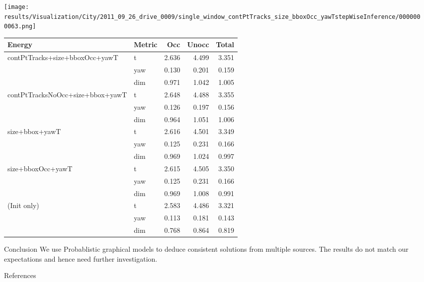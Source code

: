 \documentclass[final]{beamer}
\newlength{\sepwid}
\newlength{\onecolwid}
\begin{document}
\begin{frame}[t]
\begin{columns}[t]
    \begin{column}{\onecolwid}
      \begin{block}{}
        \texttt{[image: results/Visualization/City/2011\_09\_26\_drive\_0009/single\_window\_contPtTracks\_size\_bboxOcc\_yawTstepWiseInference/0000000063.png]}
      \end{block}
      \begin{table}
        \begin{tabular}{|l|l|r|r|r|}
          \hline
          Energy & Metric & Occ & Unocc & Total\\
          \hline
contPtTracks+size+bboxOcc+yawT  &t  &2.636&4.499&3.351\\
                                &yaw&0.130&0.201&0.159\\
                                &dim&0.971&1.042&1.005\\
          \hline
contPtTracksNoOcc+size+bbox+yawT&t  &2.648&4.488&3.355\\
                                &yaw&0.126&0.197&0.156\\
                                &dim&0.964&1.051&1.006\\
          \hline
                  size+bbox+yawT&t  &2.616&4.501&3.349\\
                                &yaw&0.125&0.231&0.166\\
                                &dim&0.969&1.024&0.997\\
          \hline
               size+bboxOcc+yawT&t  &2.615&4.505&3.350\\
                                &yaw&0.125&0.231&0.166\\
                                &dim&0.969&1.008&0.991\\
          \hline
          (Init only)           &t  &2.583&4.486&3.321\\
                                &yaw&0.113&0.181&0.143\\
                                &dim&0.768&0.864&0.819\\
          \hline
          
        \end{tabular}
      \end{table}
      \begin{block}{Conclusion}
        We use Probablistic graphical models to deduce consistent solutions from multiple sources. The results do not match our expectations and hence need further investigation.
      \end{block}
      \begin{block}{References}
        {\small
          
          
        }
      \end{block}
    \end{column}

  \begin{column}{\sepwid}\end{column}			%

  \end{columns}
\end{frame}
\end{document}
